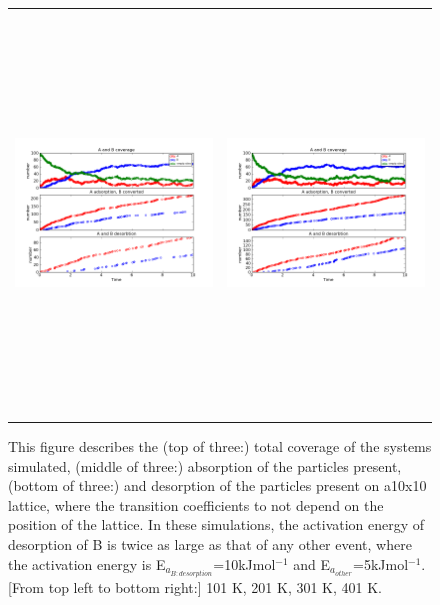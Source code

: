\documentclass[11pt]{article}
\begin{document}
\begin{figure}[h!]
\begin{tabular}{cc}
\includegraphics[width=3.5in, height=4.2in]{./coadsorb_irreversible/AtoBirreversible10x10_301_Bdes2x_EA5E3_EBx10E3_3.png} &
\includegraphics[width=3.5in, height=4.2in]{./coadsorb_irreversible/AtoBirreversible10x10_401_Bdes2x_EA5E3_EBx10E3_3.png} 
\end{tabular}
\caption{This figure describes the (top of three:) total coverage of the systems simulated, (middle of three:) absorption of the particles present, (bottom of three:) and desorption of the particles present on a10x10 lattice, where the transition coefficients to not depend on the position of the lattice. In these simulations, the activation energy of desorption of B is twice as large as that of any other event, where the activation energy is E$_{a_{B:desorption}}$=10kJmol$^{-1}$ and E$_{a_{other}}$=5kJmol$^{-1}$. [From top left to bottom right:] 101 K, 201 K, 301 K, 401 K.}
\end{figure}
\end{document}
